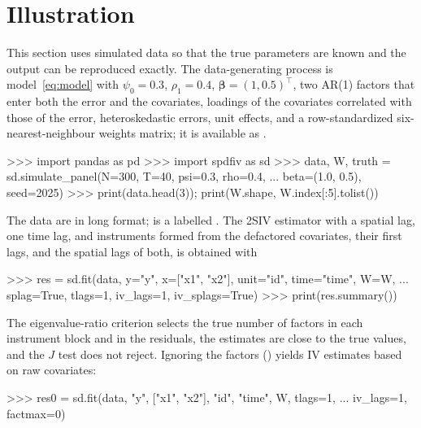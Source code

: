 \documentclass[article]{jss}
\newcommand{\fct}[1]{\code{#1()}}
\begin{document}
\section{Illustration} \label{sec:illustration}

This section uses simulated data so that the true parameters are known and
the output can be reproduced exactly. The data-generating process is
model~\eqref{eq:model} with $\psi_0=0.3$, $\rho_1=0.4$,
$\bm\beta=(1,0.5)^\top$, two AR(1) factors that enter both the error and the
covariates, loadings of the covariates correlated with those of the error,
heteroskedastic errors, unit effects, and a row-standardized six-nearest-neighbour
weights matrix; it is available as \fct{simulate\_panel}.

\begin{CodeInput}
>>> import pandas as pd
>>> import spdfiv as sd
>>> data, W, truth = sd.simulate_panel(N=300, T=40, psi=0.3, rho=0.4,
...                                    beta=(1.0, 0.5), seed=2025)
>>> print(data.head(3)); print(W.shape, W.index[:5].tolist())
\end{CodeInput}

The data are in long format;  is a labelled . The
2SIV estimator with a spatial lag, one time lag, and instruments formed from
the defactored covariates, their first lags, and the spatial lags of both,
is obtained with

\begin{CodeInput}
>>> res = sd.fit(data, y="y", x=["x1", "x2"], unit="id", time="time", W=W,
...              splag=True, tlags=1, iv_lags=1, iv_splags=True)
>>> print(res.summary())
\end{CodeInput}

The eigenvalue-ratio criterion selects the true number of factors in each
instrument block and in the residuals, the estimates are close to the true
values, and the $J$ test does not reject. Ignoring the factors
() yields IV estimates based on raw covariates:

\begin{CodeInput}
>>> res0 = sd.fit(data, "y", ["x1", "x2"], "id", "time", W, tlags=1,
...               iv_lags=1, factmax=0)
\end{CodeInput}
\end{document}
